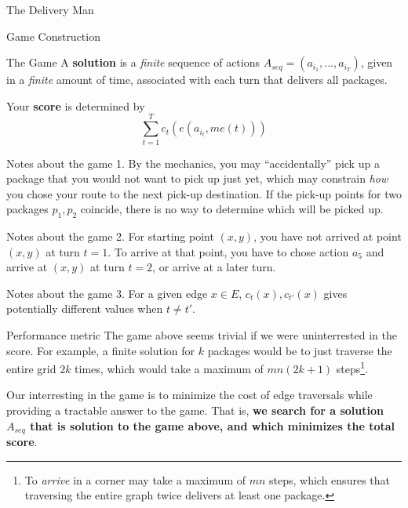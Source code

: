 \begin{section}{The Delivery Man}
\begin{subsection}{Game Construction}
\begin{subsubsection}{The Game}
      A \textbf{solution} is a \textit{finite} sequence of actions $A_{seq} = (a_{i_1}, ..., a_{i_T})$, given in a \textit{finite} amount of time, associated with each turn that delivers all packages.

      Your \textbf{score} is determined by
      \begin{equation*}
        \sum_{t = 1}^T c_t(e(a_{i_t}, me(t)))
      \end{equation*}      

      \begin{paragraph}{Notes about the game 1.}
        By the mechanics, you may ``accidentally'' pick up a package that you would not want to pick up just yet, which may constrain \textit{how} you chose your route to the next pick-up destination. If the pick-up points for two packages $p_1, p_2$ coincide, there is no way to determine which will be picked up.
      \end{paragraph}

      \begin{paragraph}{Notes about the game 2.}
        For starting point $(x, y)$, you have not arrived at point $(x,y)$ at turn $t=1$. To arrive at that point, you have to chose action $a_5$ and arrive at $(x, y)$ at turn $t=2$, or arrive at a later turn.
      \end{paragraph}

      \begin{paragraph}{Notes about the game 3.}
        For a given edge $x\in E$, $c_t(x), c_{t'}(x)$ gives potentially different values when $t \neq t'$.
      \end{paragraph}

    \end{subsubsection}
    
    \begin{subsubsection}{Performance metric}
      The game above seems trivial if we were uninterrested in the score. For example, a finite solution for $k$ packages would be to just traverse the entire grid $2k$ times, which would take a maximum of $mn(2k+1)$ steps\footnote{To \textit{arrive} in a corner may take a maximum of $mn$ steps, which ensures that traversing the entire graph twice delivers at least one package.}.

      Our interresting in the game is to minimize the cost of edge traversals while providing a tractable answer to the game. That is, \textbf{we search for a solution $A_{seq}$ that is solution to the game above, and which minimizes the total score}. 
    \end{subsubsection}

  \end{subsection}

  

\end{section}
